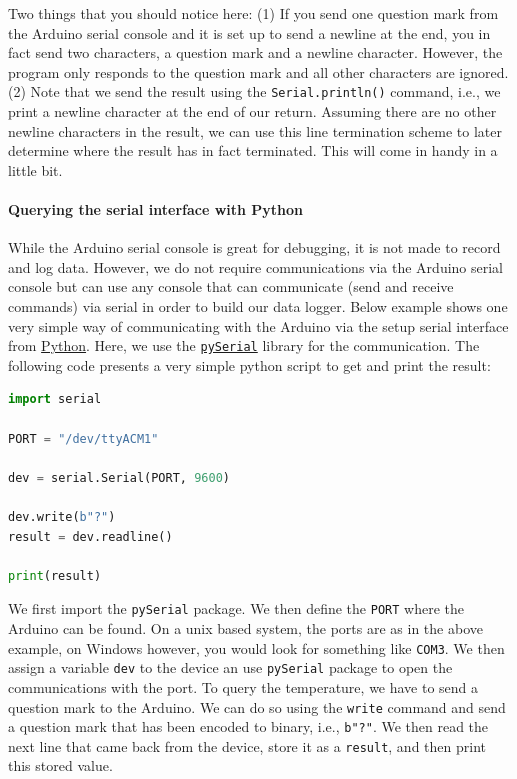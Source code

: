 Two things that you should notice here: (1) If you send one question mark from the Arduino serial console and it is set up to send a newline at the end, you in fact send two characters, a question mark and a newline character. However, the program only responds to the question mark and all other characters are ignored. (2) Note that we send the result using the \lstinline{Serial.println()} command, i.e., we print a newline character at the end of our return. Assuming there are no other newline characters in the result, we can use this line termination scheme to later determine where the result has in fact terminated. This will come in handy in a little bit.


\paragraph{Querying the serial interface with Python}
While the Arduino serial console is great for debugging, it is not made to record and log data. However, we do not require communications via the Arduino serial console but can use any console that can communicate (send and receive commands) via serial in order to build our data logger. Below example shows one very simple way of communicating with the Arduino via the setup serial interface from \href{https://www.python.org/}{Python}. Here, we use the \href{https://pyserial.readthedocs.io/en/latest/pyserial.html}{\texttt{pySerial}} library for the communication. The following code presents a very simple python script to get and print the result:
\begin{lstlisting}[language=python]
import serial

PORT = "/dev/ttyACM1"

dev = serial.Serial(PORT, 9600)

dev.write(b"?")
result = dev.readline()

print(result)
\end{lstlisting}
We first import the \lstinline{pySerial} package. We then define the \lstinline{PORT} where the Arduino can be found. On a unix based system, the ports are as in the above example, on Windows however, you would look for something like \lstinline{COM3}. We then assign a variable \lstinline{dev} to the device an use \lstinline{pySerial} package to open the communications with the port. To query the temperature, we have to send a question mark to the Arduino. We can do so using the \lstinline{write} command and send a question mark that has been encoded to binary, i.e., \lstinline{b"?"}. We then read the next line that came back from the device, store it as a \lstinline{result}, and then print this stored value.

